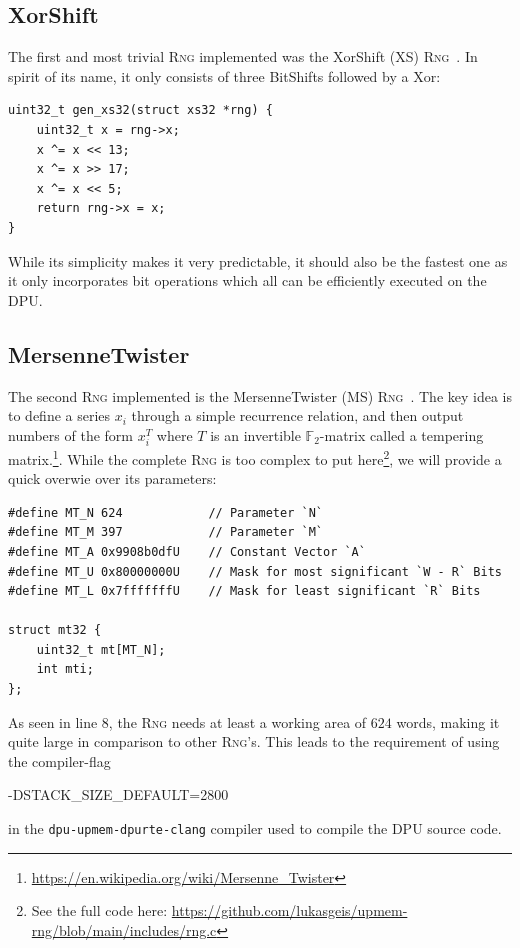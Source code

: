 \documentclass[a4paper]{scrartcl}
\begin{document}
\subsection{XorShift} \label{sec:2.1}
The first and most trivial \textsc{Rng} implemented was the XorShift (XS) \textsc{Rng}~\cite*{XS}.
In spirit of its name, it only consists of three BitShifts followed by a Xor:
\begin{lstlisting}[style=CStyle]
uint32_t gen_xs32(struct xs32 *rng) {
    uint32_t x = rng->x;
    x ^= x << 13;
    x ^= x >> 17;
    x ^= x << 5;
    return rng->x = x;
}
\end{lstlisting}
While its simplicity makes it very predictable, it should also be the fastest one as it only incorporates bit operations which all can be efficiently executed on the DPU.


\subsection{MersenneTwister} \label{sec:2.2}
The second \textsc{Rng} implemented is the MersenneTwister (MS) \textsc{Rng}~\cite*{MT}.
The key idea is to define a series $x_i$ through a simple recurrence relation, and then output numbers of the form $x_i^T$ where $T$ is an invertible $\mathbb{F}_2$-matrix called a tempering matrix.\footnote{\url{https://en.wikipedia.org/wiki/Mersenne_Twister}}.
While the complete \textsc{Rng} is too complex to put here\footnote{See the full code here: \url{https://github.com/lukasgeis/upmem-rng/blob/main/includes/rng.c}}, we will provide a quick overwie over its parameters:
\begin{lstlisting}[style=CStyle]
#define MT_N 624            // Parameter `N`
#define MT_M 397            // Parameter `M`
#define MT_A 0x9908b0dfU    // Constant Vector `A`
#define MT_U 0x80000000U    // Mask for most significant `W - R` Bits
#define MT_L 0x7fffffffU    // Mask for least significant `R` Bits

struct mt32 {
    uint32_t mt[MT_N];
    int mti;
};
\end{lstlisting}
As seen in line $8$, the \textsc{Rng} needs at least a working area of $624$ words, making it quite large in comparison to other \textsc{Rng}'s.
This leads to the requirement of using the compiler-flag 
\begin{center}
    -DSTACK\_SIZE\_DEFAULT=2800
\end{center}
in the \texttt{dpu-upmem-dpurte-clang} compiler used to compile the DPU source code.
\end{document}
